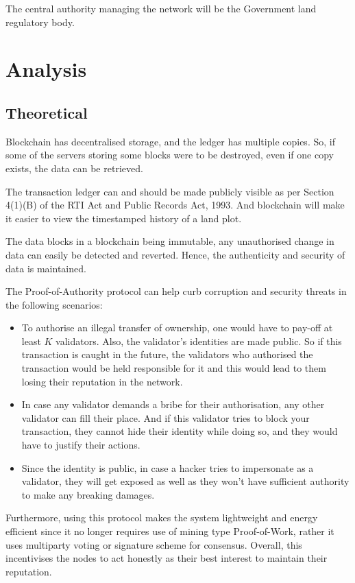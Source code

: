 \documentclass[conference]{IEEEtran}
\begin{document}
The central authority managing the network will be the Government land regulatory body.


\section{Analysis}
\subsection{Theoretical}
Blockchain has decentralised storage, and the ledger has multiple copies. So, if some of the servers storing some blocks were to be destroyed, even if one copy exists, the data can be retrieved.

The transaction ledger can and should be made publicly visible as per Section 4(1)(B) of the RTI Act and Public Records Act, 1993. And blockchain will make it easier to view the timestamped history of a land plot.

The data blocks in a blockchain being immutable, any unauthorised change in data can easily be detected and reverted. Hence, the authenticity and security of data is maintained.

The Proof-of-Authority protocol can help curb corruption and security threats in the following scenarios:
\begin{itemize}
    \item To authorise an illegal transfer of ownership, one would have to pay-off at least $K$ validators. Also, the validator's identities are made public. So if this transaction is caught in the future, the validators who authorised the transaction would be held responsible for it and this would lead to them losing their reputation in the network.
    \item In case any validator demands a bribe for their authorisation, any other validator can fill their place. And if this validator tries to block your transaction, they cannot hide their identity while doing so, and they would have to justify their actions.
    \item Since the identity is public, in case a hacker tries to impersonate as a validator, they will get exposed as well as they won't have sufficient authority to make any breaking damages.
\end{itemize}
Furthermore, using this protocol makes the system lightweight and energy efficient since it no longer requires use of mining type Proof-of-Work, rather it uses multiparty voting or signature scheme for consensus. Overall, this incentivises the nodes to act honestly as their best interest to maintain their reputation.
\end{document}

